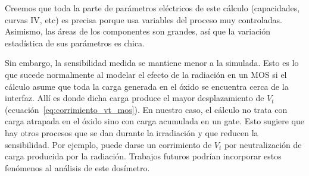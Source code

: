 Creemos que toda la parte de parámetros eléctricos de este cálculo
(capacidades, curvas IV, etc) es precisa
porque usa variables del proceso muy controladas.
Asimismo, las áreas de los componentes son grandes,
así que la variación estadística de sus parámetros es chica.

Sin embargo, la sensibilidad medida se mantiene menor a la simulada.
Esto es lo que sucede normalmente al modelar el efecto de la radiación en un MOS si el cálculo asume que toda la carga generada en el óxido se encuentra cerca de la interfaz. 
Allí es donde dicha carga produce el mayor desplazamiento de $V_t$ (ecuación~\ref{eq:corrimiento_vt_mos}).
En nuestro caso, el cálculo no trata con carga atrapada en el óxido sino con carga acumulada en un gate.
Esto sugiere que hay otros procesos que se dan durante la irradiación y que reducen la sensibilidad.
Por ejemplo, puede darse un corrimiento de $V_t$ por neutralización de carga producida por la radiación\cite{faigon_extension_2008}\cite{fleetwood_radiation-induced_1990}.
Trabajos futuros podrían incorporar estos fenómenos al análisis de este dosímetro.

